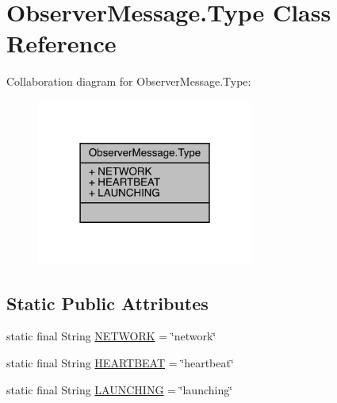 \hypertarget{classcom_1_1toast_1_1android_1_1gamebase_1_1observer_1_1_observer_message_1_1_type}{}\section{Observer\+Message.\+Type Class Reference}
\label{classcom_1_1toast_1_1android_1_1gamebase_1_1observer_1_1_observer_message_1_1_type}


Collaboration diagram for Observer\+Message.\+Type\+:\nopagebreak
\begin{figure}[H]
\begin{center}
\leavevmode
\includegraphics[width=202pt]{classcom_1_1toast_1_1android_1_1gamebase_1_1observer_1_1_observer_message_1_1_type__coll__graph}
\end{center}
\end{figure}
\subsection*{Static Public Attributes}
\begin{DoxyCompactItemize}
\item 
static final String \hyperlink{classcom_1_1toast_1_1android_1_1gamebase_1_1observer_1_1_observer_message_1_1_type_ae6d1c11b75276494cf927452ed336391}{N\+E\+T\+W\+O\+RK} = \char`\"{}network\char`\"{}
\item 
static final String \hyperlink{classcom_1_1toast_1_1android_1_1gamebase_1_1observer_1_1_observer_message_1_1_type_ab90b8bd7cb0839397fc197f9cbf8b104}{H\+E\+A\+R\+T\+B\+E\+AT} = \char`\"{}heartbeat\char`\"{}
\item 
static final String \hyperlink{classcom_1_1toast_1_1android_1_1gamebase_1_1observer_1_1_observer_message_1_1_type_a4ff7787a7bdc686350e4faf2809b9cac}{L\+A\+U\+N\+C\+H\+I\+NG} = \char`\"{}launching\char`\"{}
\end{DoxyCompactItemize}



